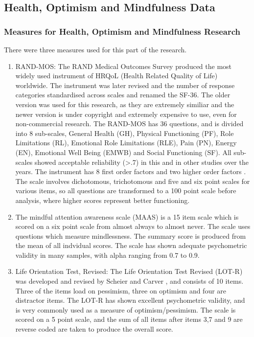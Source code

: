\subsection{Health, Optimism and Mindfulness Data}

\subsubsection{Measures for Health, Optimism and Mindfulness Research}

There were three measures used for this part of the research.
\begin{enumerate}
\item RAND-MOS: The RAND Medical Outcomes Survey produced the most widely used instrument of HRQoL (Health Related Quality of Life) worldwide. The instrument was later revised and the number of response categories standardised across scales and renamed the SF-36. The older version was used for this research, as they are extremely similiar and the newer version is under copyright and extremely expensive to use, even for non-commercial research. The RAND-MOS has 36 questions, and is divided into 8 sub-scales, General Health (GH),
Physical Functioning (PF), Role Limitations (RL), Emotional Role Limitations
(RLE), Pain (PN), Energy (EN), Emotional Well Being (EMWB) and Social
Functioning (SF). All sub-scales showed acceptable reliability
(>.7) in this and in other studies over the years\cite{Lam2007,Ferreira2000}.
The instrument has 8 first order factors and two higher order factors
\cite{Hann2008}. The scale involves dichotomous, trichotomous and
five and six point scales for various items, so all questions are
transformed to a 100 point scale before analysis, where higher scores
represent better functioning.
\item The mindful attention awareness scale (MAAS) 
\cite{brown2003benefits} is a 15 item scale which is scored on
a six point scale from almost always to almost never. The scale uses
questions which measure mindlessness. The summary score is produced
from the mean of all indvidual scores. The scale has shown adequate
psychometric validity in many samples, with alpha ranging from 0.7
to 0.9\cite{brown2003benefits,Ruth2006}.
\item Life Orientation Test, Revised: The Life Orientation Test Revised (LOT-R) was developed and revised
by Scheier and Carver \cite{Scheier1994}, and consists of 10 items.
Three of the items load on pessimism, three on optimism and four are
distractor items. The LOT-R has shown excellent psychometric validity,
and is very commonly used as a measure of optimism/pessimism. The
scale is scored on a 5 point scale, 
and the sum of all items after items 3,7 and 9 are reverse coded are taken to produce the overall score.
\end{enumerate}



